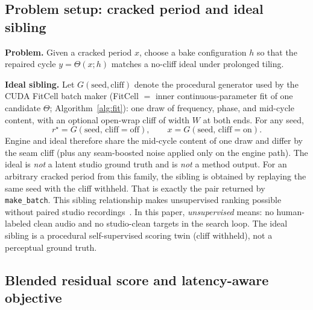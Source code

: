 \subsection{Problem setup: cracked period and ideal sibling}
\label{sec:ideal-tile}

\textbf{Problem.} Given a cracked period $x$, choose a bake configuration $h$ so that the repaired cycle $y=\Theta(x;h)$ matches a no-cliff ideal under prolonged tiling.

\textbf{Ideal sibling.}
Let $G(\mathrm{seed},\mathrm{cliff})$ denote the procedural generator used by the CUDA FitCell batch maker
(FitCell $=$ inner continuous-parameter fit of one candidate $\Theta$; Algorithm~\ref{alg:fit}):
one draw of frequency, phase, and mid-cycle content, with an optional open-wrap cliff of width $W$ at both ends.
For any seed,
\begin{equation}
\label{eq:G-siblings}
r^{\star}=G(\mathrm{seed},\,\mathrm{cliff{=}off}),\qquad
x=G(\mathrm{seed},\,\mathrm{cliff{=}on}).
\end{equation}
Engine and ideal therefore share the mid-cycle content of one draw and differ by the seam cliff (plus any seam-boosted noise applied only on the engine path).
The ideal is \emph{not} a latent studio ground truth and is \emph{not} a method output.
For an arbitrary cracked period from this family, the sibling is obtained by replaying the same seed with the cliff withheld.
That is exactly the pair returned by \texttt{make\_batch}.
This sibling relationship makes unsupervised ranking possible without paired studio recordings~\cite{lehtinen2018,kashyap2021n2n}.
In this paper, \emph{unsupervised} means: no human-labeled clean audio and no studio-clean targets in the search loop.
The ideal sibling is a procedural self-supervised scoring twin (cliff withheld), not a perceptual ground truth.

\subsection{Blended residual score and latency-aware objective}
\label{sec:residual-score}


